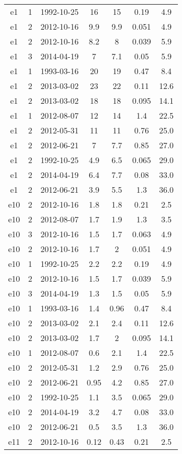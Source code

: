 \begin{table*}[htp]
\begin{tabular}{ccccccc}
e1 & 1 & 1992-10-25 & 16 & 15 & 0.19 & 4.9 \\
e1 & 2 & 2012-10-16 & 9.9 & 9.9 & 0.051 & 4.9 \\
e1 & 2 & 2012-10-16 & 8.2 & 8 & 0.039 & 5.9 \\
e1 & 3 & 2014-04-19 & 7 & 7.1 & 0.05 & 5.9 \\
e1 & 1 & 1993-03-16 & 20 & 19 & 0.47 & 8.4 \\
e1 & 2 & 2013-03-02 & 23 & 22 & 0.11 & 12.6 \\
e1 & 2 & 2013-03-02 & 18 & 18 & 0.095 & 14.1 \\
e1 & 1 & 2012-08-07 & 12 & 14 & 1.4 & 22.5 \\
e1 & 2 & 2012-05-31 & 11 & 11 & 0.76 & 25.0 \\
e1 & 2 & 2012-06-21 & 7 & 7.7 & 0.85 & 27.0 \\
e1 & 2 & 1992-10-25 & 4.9 & 6.5 & 0.065 & 29.0 \\
e1 & 2 & 2014-04-19 & 6.4 & 7.7 & 0.08 & 33.0 \\
e1 & 2 & 2012-06-21 & 3.9 & 5.5 & 1.3 & 36.0 \\
e10 & 2 & 2012-10-16 & 1.8 & 1.8 & 0.21 & 2.5 \\
e10 & 2 & 2012-08-07 & 1.7 & 1.9 & 1.3 & 3.5 \\
e10 & 3 & 2012-10-16 & 1.5 & 1.7 & 0.063 & 4.9 \\
e10 & 2 & 2012-10-16 & 1.7 & 2 & 0.051 & 4.9 \\
e10 & 1 & 1992-10-25 & 2.2 & 2.2 & 0.19 & 4.9 \\
e10 & 2 & 2012-10-16 & 1.5 & 1.7 & 0.039 & 5.9 \\
e10 & 3 & 2014-04-19 & 1.3 & 1.5 & 0.05 & 5.9 \\
e10 & 1 & 1993-03-16 & 1.4 & 0.96 & 0.47 & 8.4 \\
e10 & 2 & 2013-03-02 & 2.1 & 2.4 & 0.11 & 12.6 \\
e10 & 2 & 2013-03-02 & 1.7 & 2 & 0.095 & 14.1 \\
e10 & 1 & 2012-08-07 & 0.6 & 2.1 & 1.4 & 22.5 \\
e10 & 2 & 2012-05-31 & 1.2 & 2.9 & 0.76 & 25.0 \\
e10 & 2 & 2012-06-21 & 0.95 & 4.2 & 0.85 & 27.0 \\
e10 & 2 & 1992-10-25 & 1.1 & 3.5 & 0.065 & 29.0 \\
e10 & 2 & 2014-04-19 & 3.2 & 4.7 & 0.08 & 33.0 \\
e10 & 2 & 2012-06-21 & 0.5 & 3.5 & 1.3 & 36.0 \\
e11 & 2 & 2012-10-16 & 0.12 & 0.43 & 0.21 & 2.5 \\

\end{tabular}
\end{table*}
